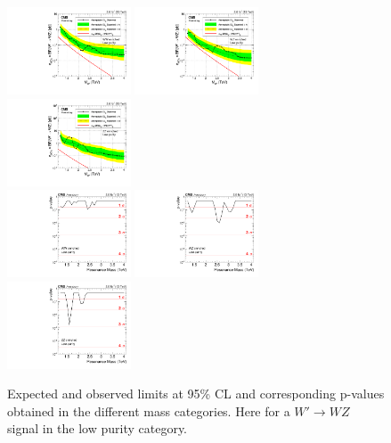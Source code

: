 \begin{figure}[h!]
\centering
\includegraphics[width=0.327\textwidth]{figures/analysis/search1/AN-15-211/limits/brazilianFlag_WZ_WWLP_13TeV_wPDF.pdf}
\includegraphics[width=0.327\textwidth]{figures/analysis/search1/AN-15-211/limits/brazilianFlag_WZ_WZLP_13TeV_wPDF.pdf}
\includegraphics[width=0.327\textwidth]{figures/analysis/search1/AN-15-211/limits/brazilianFlag_WZ_ZZLP_13TeV_wPDF.pdf}\\
\includegraphics[width=0.327\textwidth]{figures/analysis/search1/AN-15-211/pvalues/pvalue_WZinWW_low_purity.pdf}
\includegraphics[width=0.327\textwidth]{figures/analysis/search1/AN-15-211/pvalues/pvalue_WZinWZ_low_purity.pdf}
\includegraphics[width=0.327\textwidth]{figures/analysis/search1/AN-15-211/pvalues/pvalue_WZinZZ_low_purity.pdf}
\caption{Expected and observed limits at 95\% CL and corresponding p-values obtained in the different mass categories. Here for a $W'\rightarrow WZ$ signal in the low purity category.}
\label{fig:app:Limits_LPWZ}
\end{figure}
